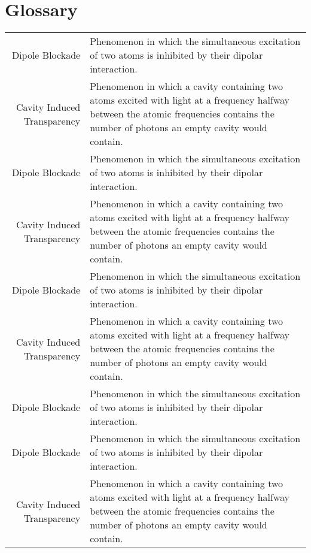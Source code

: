 \chapter*{Glossary}

\begin{center}
    \begin{longtable}{r p{}}
        Dipole Blockade             & Phenomenon in which the simultaneous excitation of two atoms is inhibited by their dipolar interaction.                                                                                  \\
        Cavity Induced Transparency & Phenomenon in which a cavity containing two atoms excited with light at a frequency halfway between the atomic frequencies contains the number of photons an empty cavity would contain. \\
        Dipole Blockade             & Phenomenon in which the simultaneous excitation of two atoms is inhibited by their dipolar interaction.                                                                                  \\
        Cavity Induced Transparency & Phenomenon in which a cavity containing two atoms excited with light at a frequency halfway between the atomic frequencies contains the number of photons an empty cavity would contain. \\
        Dipole Blockade             & Phenomenon in which the simultaneous excitation of two atoms is inhibited by their dipolar interaction.                                                                                  \\
        Cavity Induced Transparency & Phenomenon in which a cavity containing two atoms excited with light at a frequency halfway between the atomic frequencies contains the number of photons an empty cavity would contain. \\
        Dipole Blockade             & Phenomenon in which the simultaneous excitation of two atoms is inhibited by their dipolar interaction.                                                                                  \\
        Dipole Blockade             & Phenomenon in which the simultaneous excitation of two atoms is inhibited by their dipolar interaction.                                                                                  \\
        Cavity Induced Transparency & Phenomenon in which a cavity containing two atoms excited with light at a frequency halfway between the atomic frequencies contains the number of photons an empty cavity would contain. \\

\end{longtable}
\end{center}
